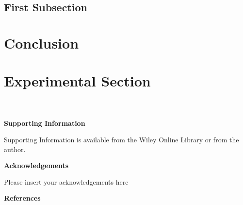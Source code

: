 \documentclass{WileyMSP-template}
\begin{document}
\subsection{First Subsection}


\section{Conclusion}


\section{Experimental Section}
\\
\\



\medskip
\textbf{Supporting Information} \par %
Supporting Information is available from the Wiley Online Library or from the author.



\medskip
\textbf{Acknowledgements} \par %
Please insert your acknowledgements here

\medskip

%




\textbf{References}\\
\end{document}
